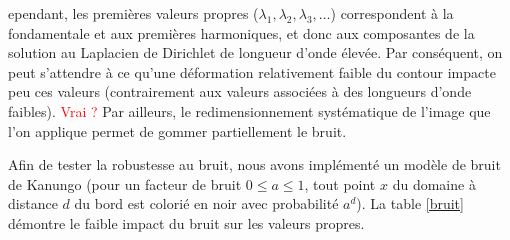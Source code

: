 \documentclass[a4paper,10pt]{article} %
\theoremstyle{definition} %
\begin{document}
ependant, les premières valeurs propres ($\lambda_1, \lambda_2, \lambda_3, \dots$) correspondent à la fondamentale et aux premières harmoniques, et donc aux composantes de la solution au Laplacien de Dirichlet de longueur d'onde élevée. Par conséquent, on peut s'attendre à ce qu'une déformation relativement faible du contour impacte peu ces valeurs (contrairement aux valeurs associées à des longueurs d'onde faibles). {\huge \textcolor{red}{Vrai ?}} Par ailleurs, le redimensionnement systématique de l'image que l'on applique permet de gommer partiellement le bruit.

Afin de tester la robustesse au bruit, nous avons implémenté un modèle de bruit de Kanungo (pour un facteur de bruit $0 \leq a \leq 1$, tout point $x$ du domaine à distance $d$ du bord est colorié en noir avec probabilité $a^d$). La table \ref{bruit} démontre le faible impact du bruit sur les valeurs propres.
\end{document}
